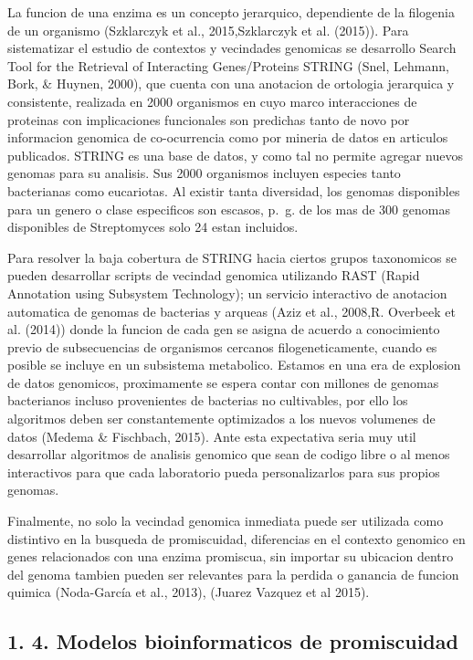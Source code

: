 \documentclass[12pt,twoside]{reedthesis}
\begin{document}
  La funcion de una enzima es un concepto jerarquico, dependiente de la
  filogenia de un organismo (Szklarczyk et al., 2015,Szklarczyk et al.
  (2015)). Para sistematizar el estudio de contextos y vecindades
  genomicas se desarrollo Search Tool for the Retrieval of Interacting
  Genes/Proteins STRING (Snel, Lehmann, Bork, \& Huynen, 2000), que cuenta
  con una anotacion de ortologia jerarquica y consistente, realizada en
  2000 organismos en cuyo marco interacciones de proteinas con
  implicaciones funcionales son predichas tanto de novo por informacion
  genomica de co-ocurrencia como por mineria de datos en articulos
  publicados. STRING es una base de datos, y como tal no permite agregar
  nuevos genomas para su analisis. Sus 2000 organismos incluyen especies
  tanto bacterianas como eucariotas. Al existir tanta diversidad, los
  genomas disponibles para un genero o clase especificos son escasos,
  p.~g. de los mas de 300 genomas disponibles de Streptomyces solo 24
  estan incluidos.
  
  Para resolver la baja cobertura de STRING hacia ciertos grupos
  taxonomicos se pueden desarrollar scripts de vecindad genomica
  utilizando RAST (Rapid Annotation using Subsystem Technology); un
  servicio interactivo de anotacion automatica de genomas de bacterias y
  arqueas (Aziz et al., 2008,R. Overbeek et al. (2014)) donde la funcion
  de cada gen se asigna de acuerdo a conocimiento previo de subsecuencias
  de organismos cercanos filogeneticamente, cuando es posible se incluye
  en un subsistema metabolico. Estamos en una era de explosion de datos
  genomicos, proximamente se espera contar con millones de genomas
  bacterianos incluso provenientes de bacterias no cultivables, por ello
  los algoritmos deben ser constantemente optimizados a los nuevos
  volumenes de datos (Medema \& Fischbach, 2015). Ante esta expectativa
  seria muy util desarrollar algoritmos de analisis genomico que sean de
  codigo libre o al menos interactivos para que cada laboratorio pueda
  personalizarlos para sus propios genomas.
  
  Finalmente, no solo la vecindad genomica inmediata puede ser utilizada
  como distintivo en la busqueda de promiscuidad, diferencias en el
  contexto genomico en genes relacionados con una enzima promiscua, sin
  importar su ubicacion dentro del genoma tambien pueden ser relevantes
  para la perdida o ganancia de funcion quimica (Noda-García et al.,
  2013), (Juarez Vazquez et al 2015).
  
  \subsection{1. 4. Modelos bioinformaticos de
  promiscuidad}\label{modelos-bioinformaticos-de-promiscuidad}
  
\end{document}
